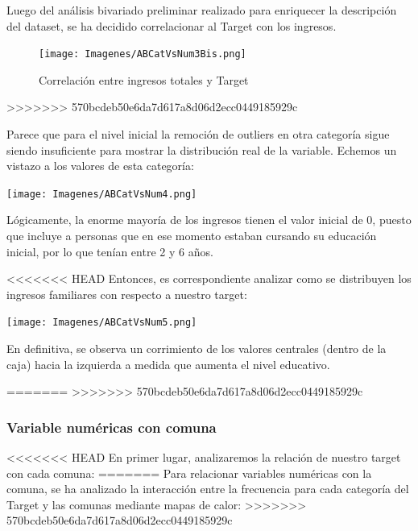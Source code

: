 \documentclass[a4paper]{article}
\begin{document}
            Luego del análisis bivariado preliminar realizado para enriquecer la descripción del dataset, se ha decidido correlacionar al Target con los ingresos.
                \begin{figure}[H]
                \centering
                    \texttt{[image: Imagenes/ABCatVsNum3Bis.png]}
                    \caption{Correlación entre ingresos totales y Target}
                    \label{AB Target and Total Incomes}
                \end{figure}
>>>>>>> 570bcdeb50e6da7d617a8d06d2ecc0449185929c
 
            Parece que para el nivel inicial la remoción de outliers en otra categoría sigue siendo insuficiente para mostrar la distribución real de la variable. Echemos un vistazo a los valores de esta categoría:
 
            \begin{center}
                \texttt{[image: Imagenes/ABCatVsNum4.png]}
            \end{center}
 
            Lógicamente, la enorme mayoría de los ingresos tienen el valor inicial de 0, puesto que incluye a personas que en ese momento estaban cursando su educación inicial, por lo que tenían entre 2 y 6 años.

<<<<<<< HEAD
            Entonces, es correspondiente analizar como se distribuyen los ingresos familiares con respecto a nuestro target:
 
            \begin{center}
                \texttt{[image: Imagenes/ABCatVsNum5.png]}
            \end{center}
 
            En definitiva, se observa un corrimiento de los valores centrales (dentro de la caja) hacia la izquierda a medida que aumenta el nivel educativo.

=======
>>>>>>> 570bcdeb50e6da7d617a8d06d2ecc0449185929c
        \newpage
 
        \subsubsection{Variable numéricas con comuna}

<<<<<<< HEAD
            En primer lugar, analizaremos la relación de nuestro target con cada comuna: 
=======
            Para relacionar variables numéricas con la comuna, se ha analizado la interacción entre la frecuencia para cada categoría del Target y las comunas mediante mapas de calor: 
>>>>>>> 570bcdeb50e6da7d617a8d06d2ecc0449185929c
 
\end{document}
